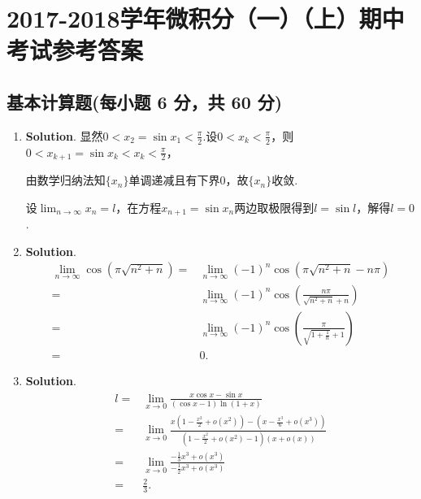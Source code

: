 \documentclass[../main.tex]{subfiles}
\begin{document}
\chapter{2017-2018学年微积分（一）（上）期中考试参考答案}
\section{基本计算题(每小题 6 分，共 60 分)}
\begin{enumerate}
    \item \textbf{Solution}. 显然$0<x_{2}=\sin x_{1}<\frac{\pi}{2}$.设$0<x_{k}<\frac{\pi}{2}$，则$0
              <x_{k+1}=\sin x_{k}<x_{k}<\frac{\pi}{2}$，

          由数学归纳法知$\{x_{n}\}$单调递减且有下界0，故$\{x_{n}\}$收敛.

          设$\lim_{n\to\infty}x_{n}=l$，在方程$x_{n+1}=\sin x_{n}$两边取极限得到$l=\sin
              l$，解得$l=0$.

    \item \textbf{Solution}.
          \[
              \begin{aligned}
                  \lim_{n\to\infty}\cos\left(\pi\sqrt{n^2+n}\right)= {} & \lim_{n\to\infty}(-1)^{n}\cos\left(\pi\sqrt{n^2+n}-n\pi\right)               \\
                  = {}                                                  & \lim_{n\to\infty}(-1)^{n}\cos\left(\frac{n\pi}{\sqrt{n^2+n}+n}\right)        \\
                  = {}                                                  & \lim_{n\to\infty}(-1)^{n}\cos\left(\frac{\pi}{\sqrt{1+\frac{1}{n}}+1}\right) \\
                  = {}                                                  & 0.
              \end{aligned}
          \]

    \item \textbf{Solution}.
          \[
              \begin{aligned}
                  l= {} & \lim_{x\to0}\frac{x\cos x-\sin x}{(\cos x-1)\ln(1+x)}                                                                                                 \\
                  = {}  & \lim_{x\to0}\frac{x\left(1-\frac{x^2}{2}+o(x^2)\right)-\left(x-\frac{x^3}{6}+o(x^3)\right)}{\left(1-\frac{x^2}{2}+o(x^2)-1\right)\left(x+o(x)\right)} \\
                  = {}  & \lim_{x\to0}\frac{-\frac{1}{3}x^3+o(x^3)}{-\frac{1}{2}x^3+o(x^3)}                                                                                     \\
                  = {}  & \frac{2}{3}.
              \end{aligned}
          \]


\end{enumerate}
\end{document}
